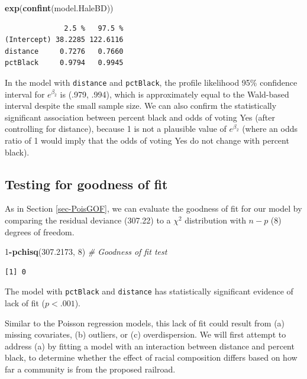 \documentclass[
]{krantz}
\newenvironment{Shaded}{\begin{snugshade}}{\end{snugshade}}
\newcommand{\CommentTok}[1]{\textcolor[rgb]{0.37,0.37,0.37}{\textit{#1}}}
\newcommand{\DecValTok}[1]{\textcolor[rgb]{0.06,0.06,0.06}{#1}}
\newcommand{\FloatTok}[1]{\textcolor[rgb]{0.06,0.06,0.06}{#1}}
\newcommand{\KeywordTok}[1]{\textcolor[rgb]{0.27,0.27,0.27}{\textbf{#1}}}
\newcommand{\NormalTok}[1]{#1}
\newcommand{\OperatorTok}[1]{\textcolor[rgb]{0.43,0.43,0.43}{\textbf{#1}}}
\begin{document}
\begin{Shaded}
\begin{Highlighting}[]
\KeywordTok{exp}\NormalTok{(}\KeywordTok{confint}\NormalTok{(model.HaleBD))}
\end{Highlighting}
\end{Shaded}

\begin{verbatim}
              2.5 %   97.5 %
(Intercept) 38.2285 122.6116
distance     0.7276   0.7660
pctBlack     0.9794   0.9945
\end{verbatim}

In the model with \texttt{distance} and \texttt{pctBlack}, the profile likelihood 95\% confidence interval for \(e^{\beta_2}\) is (.979, .994), which is approximately equal to the Wald-based interval despite the small sample size. We can also confirm the statistically significant association between percent black and odds of voting Yes (after controlling for distance), because 1 is not a plausible value of \(e^{\beta_2}\) (where an odds ratio of 1 would imply that the odds of voting Yes do not change with percent black).

\hypertarget{testing-for-goodness-of-fit}{%
\subsection{Testing for goodness of fit}\label{testing-for-goodness-of-fit}}

As in Section \ref{sec-PoisGOF}, we can evaluate the goodness of fit for our model by comparing the residual deviance (307.22) to a \(\chi^2\) distribution with \(n-p\) (8) degrees of freedom.

\begin{Shaded}
\begin{Highlighting}[]
\DecValTok{1}\OperatorTok{-}\KeywordTok{pchisq}\NormalTok{(}\FloatTok{307.2173}\NormalTok{, }\DecValTok{8}\NormalTok{)  }\CommentTok{# Goodness of fit test}
\end{Highlighting}
\end{Shaded}

\begin{verbatim}
[1] 0
\end{verbatim}

The model with \texttt{pctBlack} and \texttt{distance} has statistically significant evidence of lack of fit (\(p<.001\)).

Similar to the Poisson regression models, this lack of fit  could result from (a) missing covariates, (b) outliers, or (c) overdispersion. We will first attempt to address (a) by fitting a model with an interaction between distance and percent black, to determine whether the effect of racial composition differs based on how far a community is from the proposed railroad.
\end{document}
